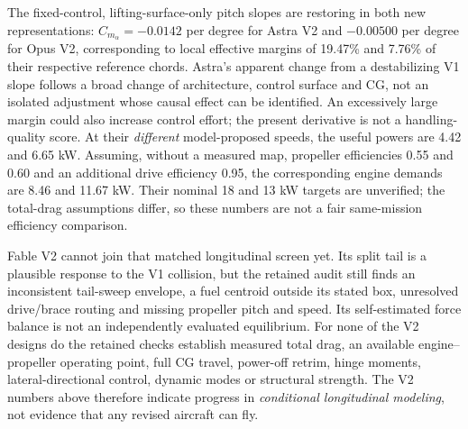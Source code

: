 \documentclass[10pt,letterpaper]{article}
\begin{document}
The fixed-control, lifting-surface-only pitch slopes are restoring in both new representations: $C_{m_\alpha}=-0.0142$ per degree for Astra V2 and $-0.00500$ per degree for Opus V2, corresponding to local effective margins of 19.47\% and 7.76\% of their respective reference chords. Astra's apparent change from a destabilizing V1 slope follows a broad change of architecture, control surface and CG, not an isolated adjustment whose causal effect can be identified. An excessively large margin could also increase control effort; the present derivative is not a handling-quality score. At their \emph{different} model-proposed speeds, the useful powers are 4.42 and 6.65 kW. Assuming, without a measured map, propeller efficiencies 0.55 and 0.60 and an additional drive efficiency 0.95, the corresponding engine demands are 8.46 and 11.67 kW. Their nominal 18 and 13 kW targets are unverified; the total-drag assumptions differ, so these numbers are not a fair same-mission efficiency comparison.

Fable V2 cannot join that matched longitudinal screen yet. Its split tail is a plausible response to the V1 collision, but the retained audit still finds an inconsistent tail-sweep envelope, a fuel centroid outside its stated box, unresolved drive/brace routing and missing propeller pitch and speed. Its self-estimated force balance is not an independently evaluated equilibrium. For none of the V2 designs do the retained checks establish measured total drag, an available engine--propeller operating point, full CG travel, power-off retrim, hinge moments, lateral-directional control, dynamic modes or structural strength. The V2 numbers above therefore indicate progress in \emph{conditional longitudinal modeling}, not evidence that any revised aircraft can fly.
\end{document}

